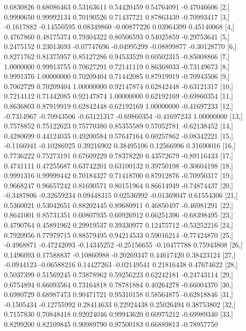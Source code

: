 \documentclass[a4paper,11pt]{scrartcl}
\begin{document}
\begin{Schunk}
\begin{Soutput}
            [,7]        [,8]        [,9]       [,10]       [,11]       [,12]
 [1,]  0.6830826  0.68086463  0.53163611  0.54420459  0.54764091 -0.47046606
 [2,]  0.9990650  0.99992134  0.70190526  0.71437721  0.87863439 -0.70993417
 [3,] -0.1617882 -0.14550595  0.08349860 -0.00877226  0.03964399  0.45140068
 [4,]  0.4767860  0.48175374  0.79304322  0.80506593  0.54025859 -0.29753641
 [5,]  0.2475152  0.23013693 -0.07747696 -0.04995299 -0.08899877 -0.30128770
 [6,]  0.8271762  0.81375957  0.85127286  0.94533529  0.60502315 -0.85008866
 [7,]  1.0000000  0.99913755  0.70627291  0.72141119  0.86368033 -0.73149673
 [8,]  0.9991376  1.00000000  0.70209404  0.71442085  0.87919919 -0.70943506
 [9,]  0.7062729  0.70209404  1.00000000  0.92147874  0.62842448 -0.63121317
[10,]  0.7214112  0.71442085  0.92147874  1.00000000  0.62192169 -0.69860354
[11,]  0.8636803  0.87919919  0.62842448  0.62192169  1.00000000 -0.41697233
[12,] -0.7314967 -0.70943506 -0.63121317 -0.69860354 -0.41697233  1.00000000
[13,]  0.7578852  0.75122623  0.75770380  0.85355589  0.57052781 -0.62138452
[14,]  0.4280699  0.44124035  0.49200584  0.57647164  0.60257862 -0.08342221
[15,] -0.1166941 -0.10286925  0.39216902  0.38495106  0.12566996  0.31690016
[16,]  0.7736222  0.75273191  0.67609229  0.78378220  0.43572679 -0.89116433
[17,]  0.4741111  0.47255687  0.63742201  0.63100132  0.39750198 -0.30604198
[18,]  0.9991316  0.99999442  0.70184327  0.71418700  0.87912876 -0.70950317
[19,]  0.9668247  0.96657242  0.81690571  0.80151964  0.86614949 -0.74874437
[20,] -0.3487806 -0.32659234  0.09448315  0.02536992 -0.01369047  0.61554306
[21,]  0.5360021  0.53042651  0.88202445  0.89680911  0.46850497 -0.46981291
[22,]  0.8641001  0.85731351  0.60807935  0.60926912  0.66251396 -0.68398495
[23,]  0.4790764  0.45891962  0.29919537  0.39330977  0.12475712 -0.53252216
[24,]  0.7920956  0.77979715  0.88579495  0.94214533  0.59016214 -0.77424870
[25,] -0.4968871 -0.47242093 -0.14345252 -0.25156655 -0.10477788  0.75943808
[26,]  0.1496093  0.17588837 -0.10860988 -0.20269347  0.44617420  0.38423124
[27,] -0.0944123 -0.06588216  0.14427263 -0.02149541  0.21816438  0.47674622
[28,]  0.5037399  0.51569245  0.73878962  0.59256223  0.62242181 -0.24743114
[29,]  0.6754894  0.66093564  0.73164818  0.78781884  0.40264278 -0.66004370
[30,]  0.6980729  0.68987473  0.90471721  0.95310158  0.58564875 -0.62818846
[31,] -0.1505434 -0.12755992  0.28414633  0.22924438  0.25026494  0.38753802
[32,]  0.7157830  0.70848418  0.92024046  0.99943620  0.60975212 -0.69989340
[33,]  0.8299200  0.82109845  0.90989790  0.97500183  0.66889813 -0.78957750

\end{Soutput}
\end{Schunk}
\end{document}
